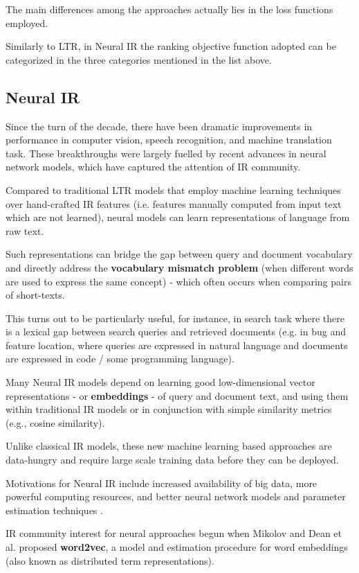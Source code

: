 The main differences among the approaches actually lies in the loss functions
employed.

Similarly to LTR, in Neural IR the ranking objective function adopted can be
categorized in the three categories mentioned in the list above.

\subsection{Neural IR}

Since the turn of the decade, there have been dramatic improvements in performance in computer vision, speech recognition, and machine translation task. These breakthroughs were largely fuelled by recent advances in neural network models, which have captured the attention of IR community.

Compared to traditional LTR models that employ machine learning techniques over hand-crafted IR features (i.e. features manually computed from input text which are not learned), neural models can learn representations of language from raw text.

Such representations can bridge the gap between query and document vocabulary and directly address the \textbf{vocabulary mismatch problem} (when different words are used to express the same concept) - which often occurs when comparing pairs of short-texts.

This turns out to be particularly useful, for instance, in search task where there is a lexical gap between search queries and retrieved documents (e.g. in bug and feature location, where queries are expressed in natural language and documents are expressed in code / some programming language).

Many Neural IR models depend on learning good
low-dimensional vector representations - or \textbf{embeddings} - of query and document text, and using them within traditional IR models or in conjunction with simple similarity metrics (e.g., cosine similarity).

Unlike classical IR models, these new machine learning based approaches are data-hungry and require large scale training data before they can be deployed.

Motivations for Neural IR include increased availability of big data, more powerful computing resources, and better neural network models and parameter estimation techniques \cite{neurev}.

IR community interest for neural approaches begun when Mikolov and Dean et al. \cite{w2v} proposed \textbf{word2vec}, a model and estimation procedure for word embeddings (also known as distributed term representations).

